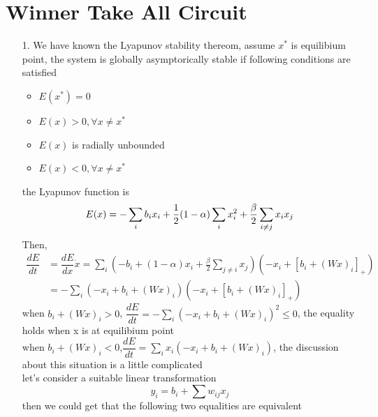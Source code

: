 \documentclass{article}
\begin{document}
\section*{Winner Take All Circuit}
\begin{enumerate}
    \item[1.]
          We have known the Lyapunov stability thereom, assume $x^*$ is equilibium point, the system is
          globally asymptorically stable if following conditions are satisfied
          \begin{itemize}
              \item $E(x^*) = 0$
              \item $E(x)>0,\forall x \neq x^*$
              \item $E(x)$ is radially unbounded
              \item $E(x)<0, \forall x\neq x^*$
          \end{itemize}
          the Lyapunov function is
          \begin{equation}
              E(x) =-\sum_{i}b_{i}x_{i}+\frac{1}{2}(1-\alpha )\sum_{i}x_{i}^{2}+\frac{%
                  \beta }{2}\sum_{i\not=j}x_{i}x_{j}
          \end{equation}
          Then,
          \begin{equation}
              \begin{split}
                  \dfrac{dE}{dt} &= \dfrac{dE}{dx}\dot{x} = \sum_i(-b_i+(1-\alpha)x_i+\frac{\beta}{2}\sum_{j\neq i}x_j)(-x_i+[b_i+(Wx)_i]_+)\\
                  & = -\sum_{i}(-x_i+b_i+(Wx)_i)(-x_i+[b_i+(Wx)_i]_+)
              \end{split}
          \end{equation}
          when $b_i+(Wx)_i>0$, $\dfrac{dE}{dt} = -\sum_{i}(-x_i+b_i+(Wx)_i)^2\leq 0$, the equality holds when x is at equilibium point\\
          when $b_i+(Wx)_i<0$,$\dfrac{dE}{dt} = \sum_{i}x_i(-x_i+b_i+(Wx)_i)$, the discussion about this situation is a little complicated\\
          let's consider a suitable linear transformation
          \begin{equation}\label{trans}
              y_i = b_i+\sum w_{ij}x_j
          \end{equation}
          then we could get that the following two equalities are equivalent
          \begin{equation}
              \begin{split}

\end{split}
\end{equation}
\end{enumerate}
\end{document}
